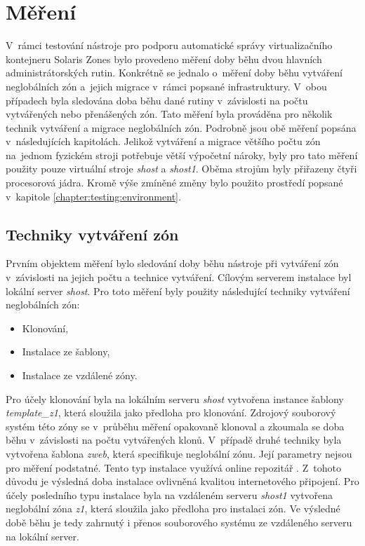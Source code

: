 \section{Měření}
\label{chapter:measurement}
V~rámci testování nástroje pro podporu automatické správy virtualizačního kontejneru Solaris Zones bylo provedeno měření doby
běhu dvou hlavních administrátorských rutin. Konkrétně se jednalo o~měření doby běhu vytváření neglobálních zón a~jejich migrace
v~rámci popsané infrastruktury. V~obou případech byla sledována doba běhu dané rutiny v~závislosti na počtu vytvářených nebo
přenášených zón. Tato měření byla prováděna pro několik technik vytváření a migrace neglobálních zón. Podrobně jsou obě měření
popsána v~následujících kapitolách. Jelikož vytváření a migrace většího počtu zón na~jednom fyzickém stroji potřebuje větší 
výpočetní nároky, byly pro tato měření použity pouze virtuální stroje \textit{shost} a \textit{shost1}. Oběma strojům byly
přiřazeny čtyři procesorová jádra. Kromě výše zmíněné změny bylo použito prostředí popsané v~kapitole \ref{chapter:testing:environment}.
\subsection{Techniky vytváření zón}
\label{chapter:measurement:creation}
Prvním objektem měření bylo sledování doby běhu nástroje při vytváření zón v~závislosti na jejich počtu a technice vytváření. Cílovým
serverem instalace byl lokální server \textit{shost}. Pro toto měření byly použity následující techniky vytváření neglobálních zón:
\begin{itemize}
 \item Klonování,
 \item Instalace ze šablony,
 \item Instalace ze vzdálené zóny.
\end{itemize}
Pro účely klonování byla na lokálním serveru \textit{shost} vytvořena instance šablony \textit{template\_z1}, která sloužila jako 
předloha pro klonování. Zdrojový souborový systém této zóny se v~průběhu měření opakovaně klonoval a zkoumala se doba běhu
v~závislosti na počtu vytvářených klonů. V~případě druhé techniky byla vytvořena šablona \textit{zweb}, která specifikuje neglobální
zónu. Její parametry nejsou pro měření podstatné. Tento typ instalace využívá online repozitář \cite{oracle:solaris:desing:pkg_repository}.
Z~tohoto důvodu je výsledná doba instalace ovlivněná kvalitou internetového připojení. Pro účely posledního typu instalace byla
na vzdáleném serveru \textit{shost1} vytvořena neglobální zóna \textit{z1}, která sloužila jako předloha pro instalaci zón. Ve
výsledné době běhu je tedy zahrnutý i přenos souborového systému ze vzdáleného serveru na lokální server.


